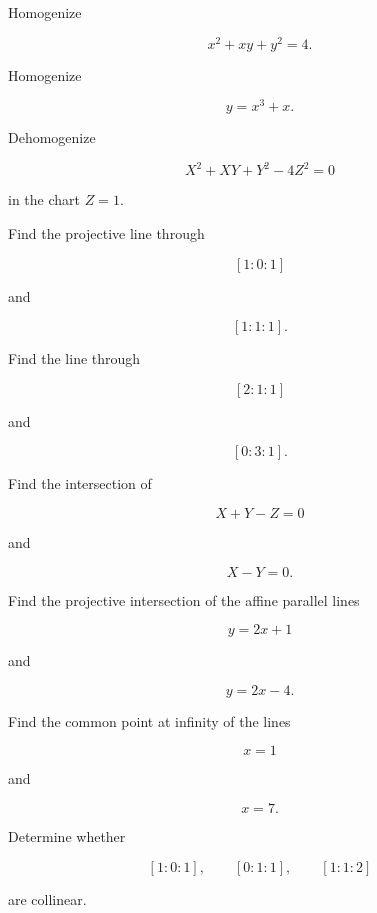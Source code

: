 \begin{exercise}[2]
Homogenize

\[
x^2+xy+y^2=4.
\]
\end{exercise}

\begin{exercise}[2]
Homogenize

\[
y=x^3+x.
\]
\end{exercise}

\begin{exercise}[2]
Dehomogenize

\[
X^2+XY+Y^2-4Z^2=0
\]

in the chart \(Z=1\).
\end{exercise}

\begin{exercise}[2]
Find the projective line through

\[
[1:0:1]
\]

and

\[
[1:1:1].
\]
\end{exercise}

\begin{exercise}[2]
Find the line through

\[
[2:1:1]
\]

and

\[
[0:3:1].
\]
\end{exercise}

\begin{exercise}[2]
Find the intersection of

\[
X+Y-Z=0
\]

and

\[
X-Y=0.
\]
\end{exercise}

\begin{exercise}[2]
Find the projective intersection of the affine parallel lines

\[
y=2x+1
\]

and

\[
y=2x-4.
\]
\end{exercise}

\begin{exercise}[2]
Find the common point at infinity of the lines

\[
x=1
\]

and

\[
x=7.
\]
\end{exercise}

\begin{exercise}[2]
Determine whether

\[
[1:0:1],\qquad
[0:1:1],\qquad
[1:1:2]
\]

are collinear.
\end{exercise}

